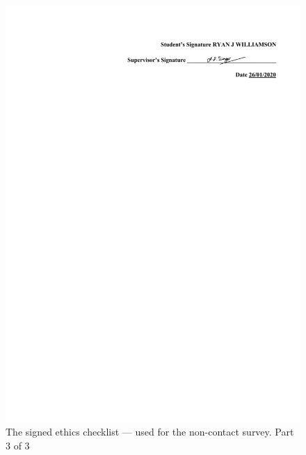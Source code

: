 \documentclass{l4proj}
\begin{document}
\begin{appendices}
    \begin{figure}[!htb]
        \centering
        \includegraphics[width=1.0\linewidth]{images/ethics_checklist_signed 3.pdf}

        \caption{ The signed ethics checklist — used for the non-contact survey. Part 3 of 3 }

        \label{fig:ethics_checklist3}
    \end{figure}


\end{appendices}
\end{document}
